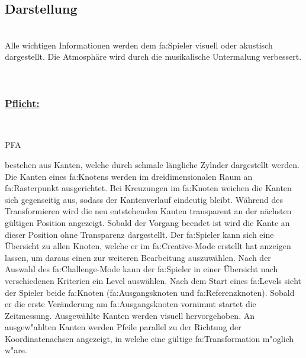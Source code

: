 %
%


\subsection{Darstellung}

%
%
\renewcommand{\K}{}
%
%

~\\
Alle wichtigen Informationen werden dem \gls{fa:Spieler} visuell oder akustisch dargestellt. Die Atmosphäre wird durch die musikalische Untermalung verbessert.

~\\

%
%
\subsubsection*{\underline{Pflicht:}}~\\

\begin{ids}{\gls{PFA\K}}

	 bestehen aus Kanten, welche durch schmale längliche Zylnder dargestellt werden.
	\id[ 290] Die Kanten eines \gls{fa:Knoten}s werden im dreidimensionalen Raum an \gls{fa:Rasterpunkt} ausgerichtet.
	\id[ 300] Bei Kreuzungen im \gls{fa:Knoten} weichen die Kanten sich gegenseitig aus, sodass der Kantenverlauf eindeutig bleibt.
	\id[ 310] Während des Transformieren wird die neu entstehenden Kanten transparent an der nächsten gültigen Position angezeigt. Sobald der Vorgang beendet ist wird die Kante an dieser Position ohne Transparenz dargestellt.
	\id[ 320] Der \gls{fa:Spieler} kann sich eine Übersicht zu allen Knoten, welche er im \gls{fa:Creative}-Mode erstellt hat anzeigen lassen, um daraus einen zur weiteren Bearbeitung auszuwählen.
	\id[ 330] Nach der Auswahl des \gls{fa:Challenge}-Mode kann der \gls{fa:Spieler} in einer Übersicht nach verschiedenen Kriterien ein Level auswählen.
	\id[ 340] Nach dem Start eines \gls{fa:Level}s sieht der Spieler beide \gls{fa:Knoten} (\gls{fa:Ausgangsknoten} und \gls{fa:Referenzknoten}). Sobald er die erste Veränderung am \gls{fa:Ausgangsknoten} vornimmt startet die Zeitmessung.
	\id[ 350] Ausgewählte Kanten werden visuell hervorgehoben.
	\id[ 355] An ausgew{"a}hlten Kanten werden Pfeile parallel zu der Richtung der Koordinatenachsen angezeigt, in welche eine gültige \gls{fa:Transformation} m{"o}glich w{"a}re.
	
	
 	
 	
	
\end{ids}

